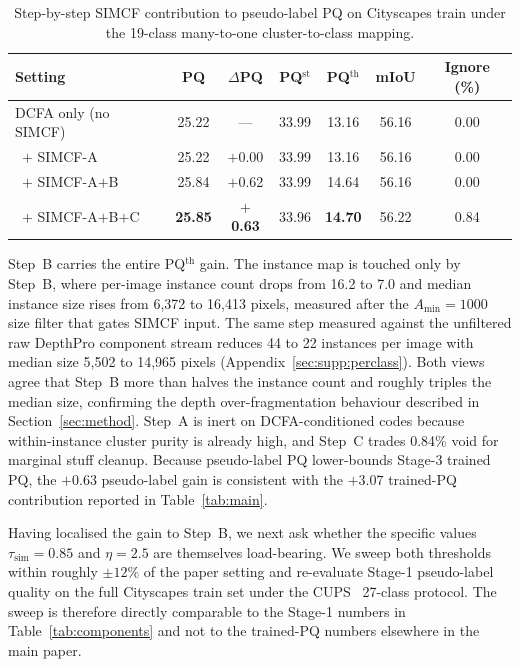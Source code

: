 \documentclass{article}
\begin{document}
\begin{table}[!htbp]
\caption{Step-by-step SIMCF contribution to pseudo-label PQ on Cityscapes train under the 19-class many-to-one cluster-to-class mapping.}
\label{tab:simcf_step_ablation}
\centering
\small
\setlength{\tabcolsep}{6pt}
\begin{tabular}{l c c c c c c}
\toprule
Setting & PQ & $\Delta$PQ & PQ$^\text{st}$ & PQ$^\text{th}$ & mIoU & Ignore (\%) \\
\midrule
DCFA only (no SIMCF)        & 25.22 & ---     & 33.99 & 13.16 & 56.16 & 0.00 \\
\, $+$ SIMCF-A              & 25.22 & $+$0.00 & 33.99 & 13.16 & 56.16 & 0.00 \\
\, $+$ SIMCF-A$+$B          & 25.84 & $+$0.62 & 33.99 & 14.64 & 56.16 & 0.00 \\
\, $+$ SIMCF-A$+$B$+$C      & \textbf{25.85} & \textbf{$+$0.63} & 33.96 & \textbf{14.70} & 56.22 & 0.84 \\
\bottomrule
\end{tabular}
\end{table}

Step~B carries the entire PQ$^\text{th}$ gain. The instance map is touched only by Step~B, where per-image instance count drops from 16.2 to 7.0 and median instance size rises from 6{,}372 to 16{,}413 pixels, measured after the $A_\text{min}{=}1000$ size filter that gates SIMCF input. The same step measured against the unfiltered raw DepthPro component stream reduces 44 to 22 instances per image with median size 5{,}502 to 14{,}965 pixels (Appendix~\ref{sec:supp:perclass}). Both views agree that Step~B more than halves the instance count and roughly triples the median size, confirming the depth over-fragmentation behaviour described in Section~\ref{sec:method}. Step~A is inert on DCFA-conditioned codes because within-instance cluster purity is already high, and Step~C trades 0.84\% void for marginal stuff cleanup. Because pseudo-label PQ lower-bounds Stage-3 trained PQ, the $+0.63$ pseudo-label gain is consistent with the $+3.07$ trained-PQ contribution reported in Table~\ref{tab:main}.

Having localised the gain to Step~B, we next ask whether the specific values $\tau_\text{sim}{=}0.85$ and $\eta{=}2.5$ are themselves load-bearing. We sweep both thresholds within roughly $\pm 12\%$ of the paper setting and re-evaluate Stage-1 pseudo-label quality on the full Cityscapes train set under the CUPS~\cite{hahn2025cups} 27-class protocol. The sweep is therefore directly comparable to the Stage-1 numbers in Table~\ref{tab:components} and not to the trained-PQ numbers elsewhere in the main paper.
\end{document}
